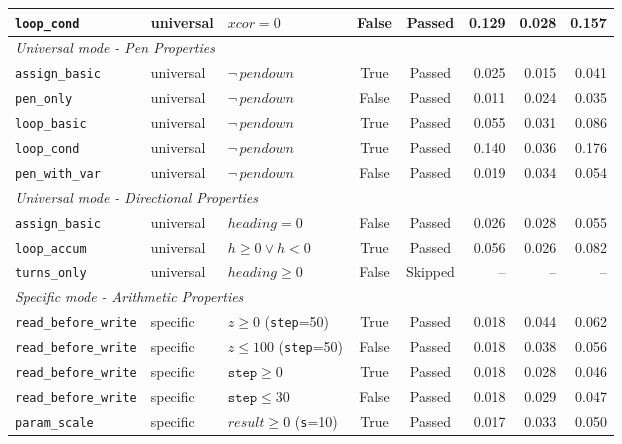 {\begin{longtable}{p{} p{} p{} c c r r r}
\texttt{loop\_cond}      & universal & $\mathit{xcor}=0$               & False & Passed & 0.129 & 0.028 & 0.157 \\
\midrule
\multicolumn{8}{l}{\textit{Universal mode - Pen Properties}} \\
\midrule
\texttt{assign\_basic}   & universal & $\neg\,\mathit{pendown}$        & True  & Passed & 0.025 & 0.015 & 0.041 \\
\texttt{pen\_only}       & universal & $\neg\,\mathit{pendown}$        & False & Passed & 0.011 & 0.024 & 0.035 \\
\texttt{loop\_basic}     & universal & $\neg\,\mathit{pendown}$        & True  & Passed & 0.055 & 0.031 & 0.086 \\
\texttt{loop\_cond}      & universal & $\neg\,\mathit{pendown}$        & True  & Passed & 0.140 & 0.036 & 0.176 \\
\texttt{pen\_with\_var}  & universal & $\neg\,\mathit{pendown}$        & False & Passed & 0.019 & 0.034 & 0.054 \\
\midrule
\multicolumn{8}{l}{\textit{Universal mode - Directional Properties}} \\
\midrule
\texttt{assign\_basic}   & universal & $\mathit{heading}=0$            & False & Passed  & 0.026 & 0.028 & 0.055 \\
\texttt{loop\_accum}     & universal & $h{\geq}0\vee h{<}0$           & True  & Passed  & 0.056 & 0.026 & 0.082 \\
\texttt{turns\_only}     & universal & $\mathit{heading}\geq 0$          & False & Skipped & --    & --    & --    \\
\midrule
\multicolumn{8}{l}{\textit{Specific mode - Arithmetic Properties}} \\
\midrule
\texttt{read\_before\_write} & specific & $z\geq 0$ (\texttt{step}=50)    & True  & Passed & 0.018 & 0.044 & 0.062 \\
\texttt{read\_before\_write} & specific & $z\leq 100$ (\texttt{step}=50)  & False & Passed & 0.018 & 0.038 & 0.056 \\
\texttt{read\_before\_write} & specific & $\texttt{step}\geq 0$           & True  & Passed & 0.018 & 0.028 & 0.046 \\
\texttt{read\_before\_write} & specific & $\texttt{step}\leq 30$          & False & Passed & 0.018 & 0.029 & 0.047 \\
\texttt{param\_scale}    & specific & $\mathit{result}\geq 0$ (\texttt{s}=10)   & True  & Passed & 0.017 & 0.033 & 0.050 \\

\end{longtable}}
